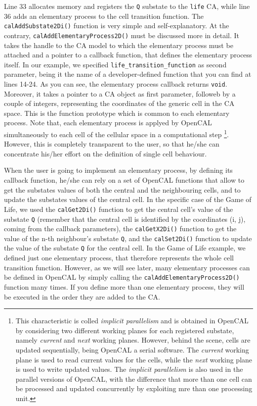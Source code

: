 Line 33 allocates memory and registers the \verb'Q' substate to the
\verb'life' CA, while line 36 adds an elementary process to the cell
transition function. The \verb'calAddSubstate2Di()' function is very
simple and self-explanatory. At the contrary,
\verb'calAddElementaryProcess2D()' must be discussed more in
detail. It takes the handle to the CA model to which the elementary
process must be attached and a pointer to a callback function, that
defines the elementary process itself. In our example, we specified
\verb'life_transition_function' as second parameter, being it the name
of a developer-defined function that you can find at lines 14-24. As
you can see, the elementary process callback returns
\verb'void'. Moreover, it takes a pointer to a CA object as first
parameter, followeb by a couple of integers, representing the
coordinates of the generic cell in the CA space. This is the function
prototype which is common to each elementary process. Note that, each
elementary process is applyed by OpenCAL simultaneously to each cell
of the cellular space in a computational step \footnote{This
  characteristic is colled \emph{implicit parallelism} and is obtained
  in OpenCAL by considering two different working planes for each
  registered substate, namely \emph{current} and \emph{next} working
  planes. However, behind the scene, cells are updated sequentially,
  being OpenCAL a serial software. The \emph{current} working plane is
  used to read current values for the cells, while the \emph{next}
  working plane is used to write updated values. The \emph{implicit
    parallelism} is also used in the parallel versions of OpenCAL,
  with the difference that more than one cell can be processed and
  updated concurrently by exploiting mre than one processing
  unit.}. However, this is completely transparent to the user, so that
he/she can concentrate his/her effort on the definition of single cell
behaviour.

When the user is going to implement an elementary process, by defining
its callback function, he/she can rely on a set of OpenCAL functions that
allow to get the substates values of both the central and the
neighbouring cells, and to update the substates values of the central
cell. In the specific case of the Game of Life, we used the
\verb'calGet2Di()' function to get the central cell's value of the
substate \verb'Q' (remember that the central cell is identified by the
coordinates (i, j), coming from the callback parameters), the
\verb'calGetX2Di()' function to get the value of the n-th neighbour's
substate \verb'Q', and the \verb'calSet2Di()' function to update the
value of the substate \verb'Q' for the central cell. In the Game of
Life example, we defined just one elementary process, that therefore
represents the whole cell transition function. However, as we will see
later, many elementary processes can be defined in OpenCAL by simply
calling the \verb'calAddElementaryProcess2D()' function many times. If
you define more than one elementary process, they will be executed in
the order they are added to the CA.

